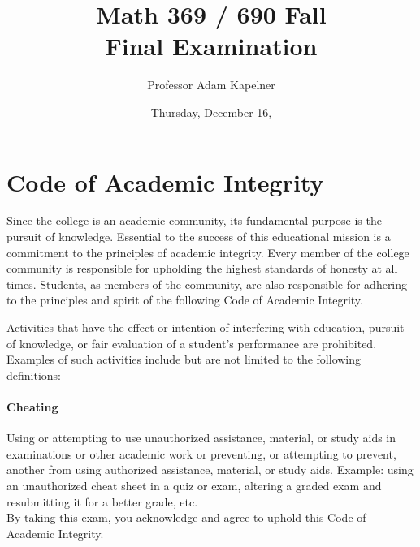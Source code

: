 \documentclass[12pt,landscape]{article}
\title{Math 369 / 690 Fall \the\year{} \\ Final Examination}
\author{Professor Adam Kapelner}
\date{Thursday, December 16, \the\year{}}
\begin{document}
\maketitle


\thispagestyle{empty}

\section*{Code of Academic Integrity}

\footnotesize
Since the college is an academic community, its fundamental purpose is the pursuit of knowledge. Essential to the success of this educational mission is a commitment to the principles of academic integrity. Every member of the college community is responsible for upholding the highest standards of honesty at all times. Students, as members of the community, are also responsible for adhering to the principles and spirit of the following Code of Academic Integrity.

Activities that have the effect or intention of interfering with education, pursuit of knowledge, or fair evaluation of a student's performance are prohibited. Examples of such activities include but are not limited to the following definitions:

\paragraph{Cheating} Using or attempting to use unauthorized assistance, material, or study aids in examinations or other academic work or preventing, or attempting to prevent, another from using authorized assistance, material, or study aids. Example: using an unauthorized cheat sheet in a quiz or exam, altering a graded exam and resubmitting it for a better grade, etc.
\\

\noindent By taking this exam, you acknowledge and agree to uphold this Code of Academic Integrity. \\


\normalsize
\vspace{-0.3cm}
\end{document}
